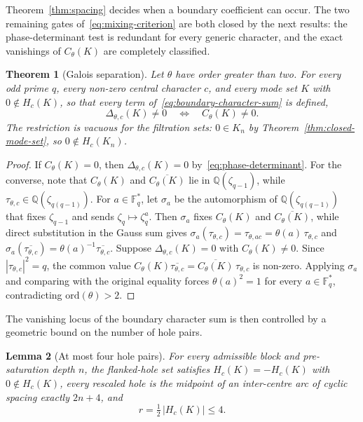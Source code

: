 \documentclass[11pt,a4paper]{article}
\newtheorem{theorem}{Theorem}[section]
\newtheorem{lemma}[theorem]{Lemma}
\theoremstyle{definition}
\theoremstyle{remark}
\newcommand{\Fq}{\mathbb{F}_q}
\newcommand{\HK}{H_c(K)}
\begin{document}
Theorem~\ref{thm:spacing} decides when a boundary coefficient can occur.
The two remaining gates of~\eqref{eq:mixing-criterion} are both closed by the next results:
the phase-determinant test is redundant for every generic character, and the exact
vanishings of $C_\theta(K)$ are completely classified.

\begin{theorem}[Galois separation]
  \label{thm:galois-separation}
  Let $\theta$ have order greater than two.
  For every odd prime $q$, every non-zero central character $c$, and every mode set $K$ with
  $0\notin\HK$, so that every term of~\eqref{eq:boundary-character-sum} is defined,
  \begin{equation}
    \Delta_{\theta,c}(K)\ne0
    \quad\Longleftrightarrow\quad
    C_\theta(K)\ne0.
    \label{eq:galois-separation}
  \end{equation}
  The restriction is vacuous for the filtration sets: $0\in K_n$ by
  Theorem~\ref{thm:closed-mode-set}, so $0\notin H_c(K_n)$.
\end{theorem}

\begin{proof}
  If $C_\theta(K)=0$, then $\Delta_{\theta,c}(K)=0$ by~\eqref{eq:phase-determinant}.
  For the converse, note that $C_\theta(K)$ and $\overline{C_\theta(K)}$ lie in
  $\mathbb{Q}(\zeta_{q-1})$, while $\tau_{\theta,c}\in\mathbb{Q}(\zeta_{q(q-1)})$.
  For $a\in\Fq^*$, let $\sigma_a$ be the automorphism of $\mathbb{Q}(\zeta_{q(q-1)})$ that
  fixes $\zeta_{q-1}$ and sends $\zeta_q\mapsto\zeta_q^a$.
  Then $\sigma_a$ fixes $C_\theta(K)$ and $\overline{C_\theta(K)}$, while direct substitution
  in the Gauss sum gives
  $\sigma_a(\tau_{\theta,c})=\tau_{\theta,ac}=\theta(a)\,\tau_{\theta,c}$ and
  $\sigma_a(\overline{\tau_{\theta,c}})=\theta(a)^{-1}\overline{\tau_{\theta,c}}$.
  Suppose $\Delta_{\theta,c}(K)=0$ with $C_\theta(K)\ne0$.
  Since $|\tau_{\theta,c}|^2=q$, the common value
  $C_\theta(K)\overline{\tau_{\theta,c}}=\overline{C_\theta(K)}\,\tau_{\theta,c}$ is
  non-zero.
  Applying $\sigma_a$ and comparing with the original equality forces $\theta(a)^2=1$ for
  every $a\in\Fq^*$, contradicting $\mathrm{ord}(\theta)>2$.
\end{proof}

The vanishing locus of the boundary character sum is then controlled by a geometric bound on
the number of hole pairs.

\begin{lemma}[At most four hole pairs]
  \label{lem:hole-pairs}
  For every admissible block and pre-saturation depth $n$, the flanked-hole set satisfies
  $\HK=-\HK$ with $0\notin\HK$, every rescaled hole is the midpoint of an inter-centre arc
  of cyclic spacing exactly $2n+4$, and
  \begin{equation}
    r=\tfrac12\,|\HK|\leq4.
    \label{eq:hole-pair-bound}
  \end{equation}
\end{lemma}
\end{document}
